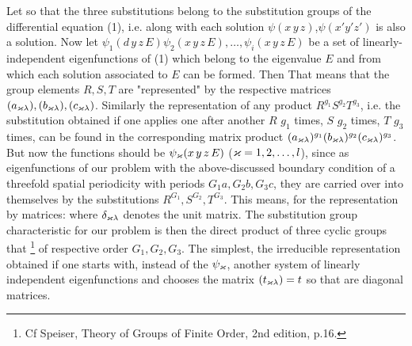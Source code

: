 \begin{paper}{1}
Let
so that the three substitutions
belong to the substitution groups of the differential equation (1), i.e. along with each solution $\psi(x\,y\,z)$,$\psi(x'y'z')$ is also a solution. Now let $\psi_1(d\,y\,z\,E) \psi_2(x\,y\,z\,E), \dots, \psi_i(x\,y\,z\,E)$ be a set of linearly-independent eigenfunctions of (1) which belong to the eigenvalue $E$ and from which each solution associated to $E$ can be formed. Then
That means that the group elements $R,S,T$ are "represented" by the respective matrices $(a_{\varkappa\lambda}), (b_{\varkappa\lambda}), (c_{\varkappa\lambda})$. Similarly the representation of any product $R^{g_1} S^{g_2} T^{g_3}$, i.e. the substitution obtained if one applies one after another $R$ $g_1$ times, $S$ $g_2$ times, $T$ $g_3$ times, can be found in the corresponding matrix product $(a_{\varkappa\lambda})^{g_1}(b_{\varkappa\lambda})^{g_2}(c_{\varkappa\lambda})^{g_3}$. But now the functions should be $\psi_\varkappa(x\,y\,z\,E)$ ($\varkappa=1,2,\dots,l$), since as eigenfunctions of our problem with the above-discussed boundary condition of a threefold spatial periodicity with periods $G_1a, G_2b, G_3c$, they are carried over into themselves by the substitutions $R^{G_1},S^{G_2},T^{G_3}$. This means, for the representation by matrices:
where $\delta_{\varkappa\lambda}$ denotes the unit matrix. The substitution group characteristic for our problem is then the direct product of three cyclic groups that \footnote{Cf Speiser, Theory of Groups of Finite Order, 2nd edition, p.16.} of respective order $G_1,G_2,G_3$. The simplest, the irreducible representation obtained if one starts with, instead of the $\psi_\varkappa$, another system of linearly independent eigenfunctions
and chooses the matrix $(t_{\varkappa\lambda})=t$ so that
are diagonal matrices.


\end{paper}
